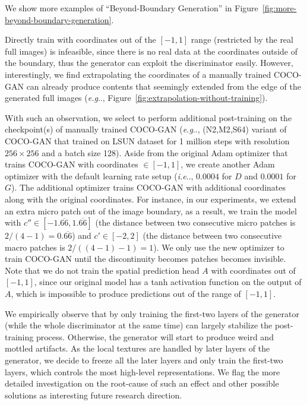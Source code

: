 \documentclass{article}
\makeatletter
\newcommand{\modelName}{COCO-GAN }
\DeclareRobustCommand\onedot{\futurelet\@let@token\@onedot}
\def\@onedot{\ifx\@let@token.\else.\null\fi\xspace}
\def\eg{\emph{e.g}\onedot} \def\Eg{\emph{E.g}\onedot}
\def\ie{\emph{i.e}\onedot} \def\Ie{\emph{I.e}\onedot}
\makeatother
\begin{document}
\begin{appendices}
    We show more examples of ``Beyond-Boundary Generation'' in Figure~\ref{fig:more-beyond-boundary-generation}.

    Directly train with coordinates out of the $[-1,1]$ range (restricted by the real full images) is infeasible, since there is no real data at the coordinates outside of the boundary, thus the generator can exploit the discriminator easily. However, interestingly, we find extrapolating the coordinates of a manually trained COCO-GAN can already produce contents that seemingly extended from the edge of the generated full images (\eg, Figure~\ref{fig:extrapolation-without-training}). 
    
    With such an observation, we select to perform additional post-training on the checkpoint(s) of manually trained COCO-GAN (\eg, (N2,M2,S64) variant of \modelName that trained on LSUN dataset for 1 million steps with resolution $256\times256$ and a batch size 128). Aside from the original Adam optimizer that trains COCO-GAN with coordinates $\in \left[-1,1\right]$, we create another Adam optimizer with the default learning rate setup (\ie, $0.0004$ for $D$ and $0.0001$ for $G$). The additional optimizer trains COCO-GAN with additional coordinates along with the original coordinates. For instance, in our experiments, we extend an extra micro patch out of the image boundary, as a result, we train the model with $c''\in \left[-1.\overline{66},1.\overline{66}\right]$ (the distance between two consecutive micro patches is $2/(4-1)=0.\overline{66}$) and $c' \in [-2,2]$ (the distance between two consecutive macro patches is $2/((4-1)-1)=1$). We only use the new optimizer to train COCO-GAN until the discontinuity becomes patches becomes invisible. Note that we do not train the spatial prediction head $A$ with coordinates out of $\left[-1,1\right]$, since our original model has a tanh activation function on the output of $A$, which is impossible to produce predictions out of the range of $\left[-1,1\right]$.
    
    We empirically observe that by only training the first-two layers of the generator (while the whole discriminator at the same time) can largely stabilize the post-training process. Otherwise, the generator will start to produce weird and mottled artifacts. As the local textures are handled by later layers of the generator, we decide to freeze all the later layers and only train the first-two layers, which controls the most high-level representations. We flag the more detailed investigation on the root-cause of such an effect and other possible solutions as interesting future research direction.
    

\end{appendices}
\end{document}
